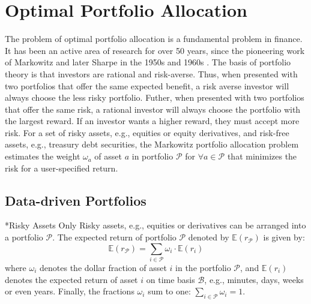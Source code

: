 \documentclass[11pt]{article}
\makeatletter
\theoremstyle{definition}
\renewcommand\subsubsection{\@startsection
	{subsubsection}{2}{0mm}
	{-0.05in}
	{-0.5\baselineskip}
	{\normalfont\normalsize\itshape\bfseries}}
\makeatother
\begin{document}
\section{Optimal Portfolio Allocation}
The problem of optimal portfolio allocation is a fundamental problem in finance. 
It has been an active area of research for over 50 years, since the pioneering work of Markowitz and later Sharpe in the 1950s and 1960s \cite{MPT1952, SHARPE1963}.
The basis of portfolio theory is that investors are rational and risk-averse. 
Thus, when presented with two portfolios that offer the same expected benefit, a risk averse investor will always 
choose the less risky portfolio. Futher, when presented with two portfolios that offer the same risk, a rational investor will always 
choose the portfolio with the largest reward. If an investor wants a higher reward, they must accept more risk.
For a set of risky assets, e.g., equities or equity derivatives, and risk-free assets, e.g., 
treasury debt securities, the Markowitz portfolio allocation problem estimates the weight $\omega_{a}$ of asset $a$ in portfolio $\mathcal{P}$ 
for $\forall{a}\in\mathcal{P}$ that minimizes the risk for a user-specified return.

\subsection{Data-driven Portfolios}\label{sec:the-min-var-portfolio-problem}

\subsubsection*{Risky Assets Only}\label{subsec:risky-assets-only}
Risky assets, e.g., equities or derivatives can be arranged into a portfolio $\mathcal{P}$. 
The expected return of portfolio $\mathcal{P}$ denoted by $\mathbb{E}\left(r_{\mathcal{P}}\right)$ is given by:
\begin{equation*}
\mathbb{E}\left(r_{\mathcal{P}}\right) = \sum_{i\in\mathcal{P}}\omega_{i}\cdot\mathbb{E}\left(r_{i}\right)
\end{equation*}
where $\omega_{i}$ denotes the dollar fraction of asset $i$ in the portfolio $\mathcal{P}$, and 
$\mathbb{E}\left(r_{i}\right)$ denotes the expected return of asset $i$ on time basis $\mathcal{B}$, e.g., minutes, days, weeks or even years.
Finally, the fractions $\omega_{i}$ sum to one: $\sum_{i\in\mathcal{P}}\omega_{i} = 1$.
\end{document}
